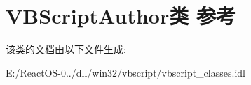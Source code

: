 \hypertarget{class_v_b_script_author}{}\section{V\+B\+Script\+Author类 参考}
\label{class_v_b_script_author}


该类的文档由以下文件生成\+:\begin{DoxyCompactItemize}
\item 
E\+:/\+React\+O\+S-\/0../dll/win32/vbscript/vbscript\+\_\+classes.\+idl\end{DoxyCompactItemize}
